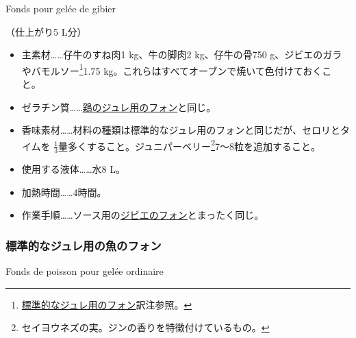 \begin{recette}
\begin{frsubenv}

Fonds pour gelée de gibier

\end{frsubenv}


（仕上がり5 L分）

\begin{itemize}
\item
  主素材\ldots{}\ldots{}仔牛のすね肉1 kg、牛の脚肉2 kg、仔牛の骨750
  g、ジビエのガラやバモルソー\footnote{\protect\hyperlink{fonds-pour-gelee-ordinaire}{標準的なジュレ用のフォン}訳注参照。}1.75
  kg。これらはすべてオーブンで焼いて色付けておくこと。
\item
  ゼラチン質\ldots{}\ldots{}\protect\hyperlink{fonds-pour-gelee-de-volaille}{鶏のジュレ用のフォン}と同じ。
\item
  香味素材\ldots{}\ldots{}材料の種類は標準的なジュレ用のフォンと同じだが、セロリとタイムを
  \(\frac{1}{3}\)量多くすること。ジュニパーベリー\footnote{セイヨウネズの実。ジンの香りを特徴付けているもの。}7〜8粒を追加すること。
\item
  使用する液体\ldots{}\ldots{}水8 L。
\item
  加熱時間\ldots{}\ldots{}4時間。
\item
  作業手順\ldots{}\ldots{}ソース用の\protect\hyperlink{fonds-de-gibier}{ジビエのフォン}とまったく同じ。
\end{itemize}

\atoaki{}

\hypertarget{fonds-de-poisson-pour-gelee-ordinaire}{%
\subsubsection{標準的なジュレ用の魚のフォン}\label{fonds-de-poisson-pour-gelee-ordinaire}}

\begin{frsubenv}

Fonds de poisson pour gelée ordinaire

\end{frsubenv}



\end{recette}
